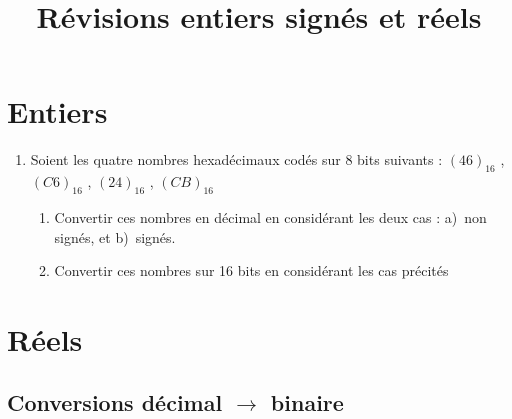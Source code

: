 \documentclass[a4paper,12pt]{article}
\begin{document}
\title{Révisions entiers signés et réels}
\author{}
\date{}
\maketitle

\section{Entiers}

\begin{enumerate}
\item Soient les quatre nombres hexadécimaux codés sur 8 bits suivants :
$(46)_{16}$ , $(C6)_{16}$ , $(24)_{16}$ , $(CB)_{16}$
\begin{enumerate}
\item Convertir ces nombres en décimal en considérant les deux cas :
  a)~non signés, et b)~signés.
\item Convertir ces nombres sur 16 bits en considérant les cas précités
\end{enumerate}

\end{enumerate}


\section{Réels}

\subsection{Conversions décimal $\rightarrow$ binaire}
\end{document}
